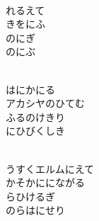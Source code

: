 \documentclass[10pt,b5j]{tarticle} %
\begin{document}
\vspace{1.5em} %
\newcommand{\linespace}{0.5em} %
\newcommand{\blocksize}{0.5\hsize} %
\newcommand{\itemmargin}{3em} %
\begin{enumerate} %
    \setlength{\itemindent}{\itemmargin} %
    \begin{minipage}[c]{\blocksize}
    
        \vspace{\linespace}
        \item~\\
        れるえて\\
        きをにふ\\
        のにぎ\\
        のにぶ
        
    \end{minipage}
    \begin{minipage}[c]{\blocksize}
        
        \vspace{\linespace}
        \item~\\
        はにかにる\\
        アカシヤのひてむ\\
        ふるのけきり\\
        にひびくしき
        
    \end{minipage}
    \begin{minipage}[c]{\blocksize}
        
        \vspace{\linespace}
        \item~\\
        うすくエルムにえて\\
        かそかににながる\\
        らひけるぎ\\
        のらはにせり
        

\end{minipage}
\end{enumerate}
\end{document}
